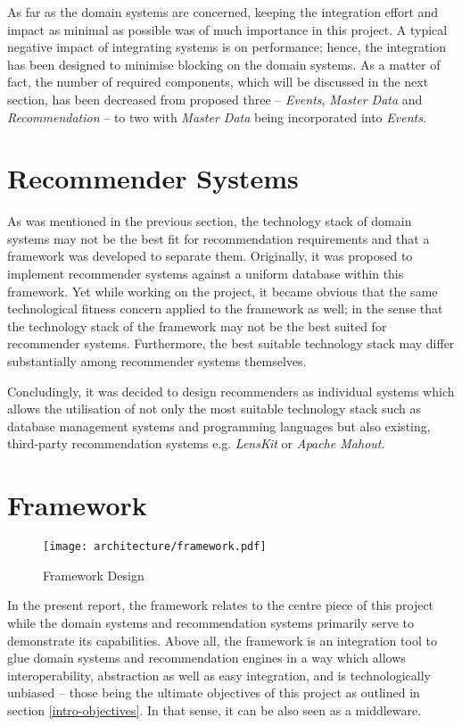 As far as the domain systems are concerned, keeping the integration effort and impact as minimal as possible was of much importance in this project. A typical negative impact of integrating systems is on performance; hence, the integration has been designed to minimise blocking on the domain systems. As a matter of fact, the number of required components, which will be discussed in the next section, has been decreased from proposed three -- \emph{Events}, \emph{Master Data} and \emph{Recommendation} -- to two with \emph{Master Data} being incorporated into \emph{Events}.

\section{Recommender Systems}
\label{architecture-recommender-systems}

As was mentioned in the previous section, the technology stack of domain systems may not be the best fit for recommendation requirements and that a framework was developed to separate them. Originally, it was proposed to implement recommender systems against a uniform database within this framework. Yet while working on the project, it became obvious that the same technological fitness concern applied to the framework as well; in the sense that the technology stack of the framework may not be the best suited for recommender systems. Furthermore, the best suitable technology stack may differ substantially among recommender systems themselves.

Concludingly, it was decided to design recommenders as individual systems which allows the utilisation of not only the most suitable technology stack such as database management systems and programming languages but also existing, third-party recommendation systems e.g. \emph{LensKit} or \emph{Apache Mahout}.

\section{Framework}

\begin{figure}[ht]
    \texttt{[image: architecture/framework.pdf]}
    \caption{Framework Design}
    \label{fig:architecture-framework}
\end{figure}

In the present report, the framework relates to the centre piece of this project while the domain systems and recommendation systems primarily serve to demonstrate its capabilities. Above all, the framework is an integration tool to glue domain systems and recommendation engines in a way which allows interoperability, abstraction as well as easy integration, and is technologically unbiased -- those being the ultimate objectives of this project as outlined in section \ref{intro-objectives}. In that sense, it can be also seen as a middleware.

